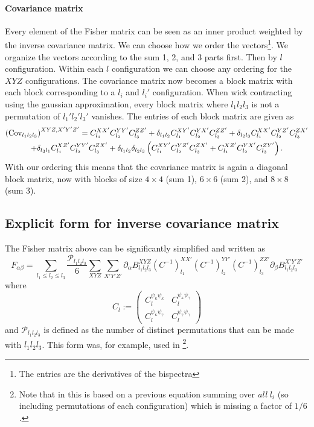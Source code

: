 \documentclass[11pt]{article} %
\DeclareRobustCommand{\Cov}{\ifmmode\text{Cov}\else d\fi}
\newcommand{\br}[1]{\ensuremath{\left( #1 \right)}}
\begin{document}
\paragraph{Covariance matrix}
Every element of the Fisher matrix can be seen as an inner product weighted by the inverse covariance matrix. We can choose how we order the vectors\footnote{The entries are the derivatives of the bispectra}. We organize the vectors according to the sum 1, 2, and 3 parts first. Then by $l$ configuration. Within each $l$ configuration we can choose any ordering for the $XYZ$ configurations. The covariance matrix now becomes a block matrix with each block corresponding to a $l_i$ and $l_i'$ configuration. When wick contracting using the gaussian approximation, every block matrix where $l_1l_2l_3$ is not a permutation of $l_1'l_2'l_3'$ vanishes. The entries of each block matrix are given as
\begin{gather*}
    \br{\Cov_{l_1l_2l_3}}^{XYZ,X'Y'Z'} = C^{XX'}_{l_1}C^{YY'}_{l_2}C^{ZZ'}_{l_3} + \delta_{l_1l_2}C^{XY'}_{l_1}C^{YX'}_{l_2}C^{ZZ'}_{l_3} +\delta_{l_2l_3}C^{XX'}_{l_1}C^{YZ'}_{l_2}C^{ZX'}_{l_3} \\ + \delta_{l_3l_1}C^{XZ'}_{l_1}C^{YY'}_{l_2}C^{ZX'}_{l_3} +\delta_{l_1l_2}\delta_{l_2l_3}\br{C^{XY'}_{l_1}C^{YZ'}_{l_2}C^{ZX'}_{l_3} +C^{XZ'}_{l_1}C^{YX'}_{l_2}C^{ZY'}_{l_3}}.
\end{gather*}
With our ordering this means that the covariance matrix is again a diagonal block matrix, now with blocks of size $4 \times 4$ (sum 1), $6 \times 6$ (sum 2), and $8 \times 8$ (sum 3).

\subsection{Explicit form for inverse covariance matrix}
The Fisher matrix above can be significantly simplified and written as
\begin{equation*}
F_{\alpha\beta} = \sum_{l_1 \leq l_2 \leq l_3} \frac{\mathcal P _{l_1l_2l_3}}{6}
\sum_{XYZ}\sum_{X'Y'Z'} 
\partial_\alpha B^{X Y Z}_{l_1 l_2 l_3} 
(C^{-1})^{X X'}_{l_1}
(C^{-1})^{Y Y'}_{l_2}
(C^{-1})^{Z Z'}_{l_3}
\partial_\beta B^{X' Y' Z'}_{l_1 l_2 l_3}
\end{equation*}
where
\begin{equation*}
    C_{l} := \begin{pmatrix}
        C^{\psi_\kappa\psi_\kappa}_l & C^{\psi_\kappa\psi_\gamma}_l \\
        C^{\psi_\kappa\psi_\gamma}_l & C^{\psi_\gamma\psi_\gamma}_l
    \end{pmatrix}
\end{equation*}
and $\mathcal P_{l_1l_2l_3}$ is defined as the number of distinct permutations that can be made with $l_1l_2l_3$. This form was, for example, used in \cite{Kalaja_2021}\footnote{Note that in \cite{Kalaja_2021} this is based on a previous equation summing over \textit{all} $l_i$ (so including permutations of each configuration) which is missing a factor of $1/6$.}.
\end{document}
